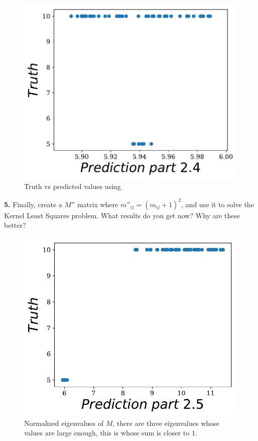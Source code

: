 \documentclass[14pt]{article}
\begin{document}
\begin{figure}[H]
\centering
\includegraphics[scale=0.5]{kernel2.pdf}
\caption{ Truth vs predicted values using \label{fig:k2}}
\end{figure}

\begin{mdframed}
\textbf{5.} Finally, create a $M''$ matrix where $m''_{ij}=(m_{ij}+1)^2$, and use it to solve
the Kernel Least Squares problem. What results do you get now? Why are
these better?
\end{mdframed}


\begin{figure}[H]
\centering
\includegraphics[scale=0.5]{kernel3.pdf}
\caption{ Normalized eigenvalues of $M$, there are three eigenvalues whose values
are large enough, this is whose sum is closer to $1$.}
\end{figure}
\end{document}
